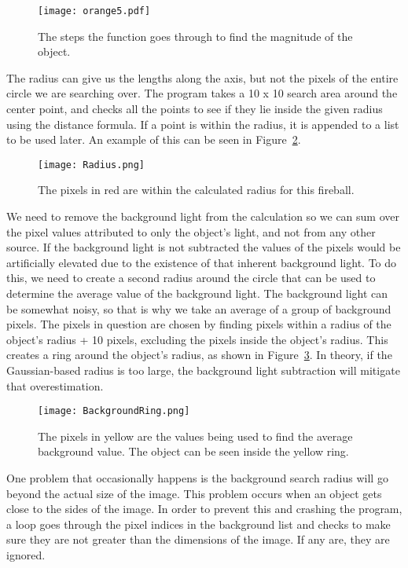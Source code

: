 \begin{figure}[htpb]
	\centering
	\texttt{[image: orange5.pdf]}
	\caption{The steps the function goes through to find the magnitude of the object.}
	\label{fig:magfinder}
\end{figure}

The radius can give us the lengths along the axis, but not the pixels of the entire circle we are searching over. The program takes a 10 x 10 search area around the center point, and checks all the points to see if they lie inside the given radius using the distance formula. If a point is within the radius, it is appended to a list to be used later. An example of this can be seen in Figure~\ref{fig:radius}.

\begin{figure}[ht!]
	\centering
	\texttt{[image: Radius.png]}
	\caption{The pixels in red are within the calculated radius for this fireball.}
	\label{fig:radius}
\end{figure}

We need to remove the background light from the calculation so we can sum over the pixel values attributed to only the object's light, and not from any other source. If the background light is not subtracted the values of the pixels would be artificially elevated due to the existence of that inherent background light. To do this, we need to create a second radius around the circle that can be used to determine the average value of the background light. The background light can be somewhat noisy, so that is why we take an average of a group of background pixels. The pixels in question are chosen by finding pixels within a radius of the object's radius + 10 pixels, excluding the pixels inside the object's radius. This creates a ring around the object's radius, as shown in Figure~\ref{fig:background}. In theory, if the Gaussian-based radius is too large, the background light subtraction will mitigate that overestimation.

\begin{figure}[ht!]
	\centering
	\texttt{[image: BackgroundRing.png]}
	\caption{The pixels in yellow are the values being used to find the average background value. The object can be seen inside the yellow ring.}
	\label{fig:background}
\end{figure}

One problem that occasionally happens is the background search radius will go beyond the actual size of the image. This problem occurs when an object gets close to the sides of the image. In order to prevent this and crashing the program, a loop goes through the pixel indices in the background list and checks to make sure they are not greater than the dimensions of the image. If any are, they are ignored. 

